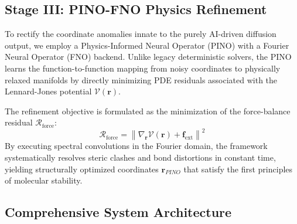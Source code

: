 \documentclass[conference]{IEEEtran}
\begin{document}
\subsection{Stage III: PINO-FNO Physics Refinement}
To rectify the coordinate anomalies innate to the purely AI-driven diffusion output, we employ a Physics-Informed Neural Operator (PINO) with a Fourier Neural Operator (FNO) backend. Unlike legacy deterministic solvers, the PINO learns the function-to-function mapping from noisy coordinates to physically relaxed manifolds by directly minimizing PDE residuals associated with the Lennard-Jones potential $\mathcal{V}(\mathbf{r})$.

The refinement objective is formulated as the minimization of the force-balance residual $\mathcal{R}_{\text{force}}$:
\begin{equation}
    \mathcal{R}_{\text{force}} = \left\| \nabla_{\mathbf{r}} \mathcal{V}(\mathbf{r}) + \mathbf{f}_{\text{ext}} \right\|^2
\end{equation}
By executing spectral convolutions in the Fourier domain, the framework systematically resolves steric clashes and bond distortions in constant time, yielding structurally optimized coordinates $\mathbf{r}_{PINO}$ that satisfy the first principles of molecular stability.

\subsection{Comprehensive System Architecture}
\end{document}
